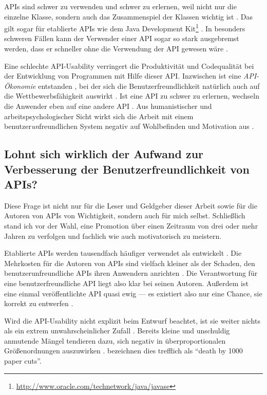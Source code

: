 APIs sind schwer zu verwenden \citep{Stylos:2006ji} und schwer zu erlernen, weil nicht nur die einzelne Klasse, sondern auch das Zusammenspiel der Klassen wichtig ist \citep{Bruch:2006bv}. Das gilt sogar für etablierte APIs wie dem Java Development Kit\footnote{\url{http://www.oracle.com/technetwork/java/javase}} \citep{Stylos:2009gc}. In besonders schweren Fällen kann der Verwender einer API sogar so stark ausgebremst werden, dass er schneller ohne die Verwendung der API gewesen wäre \citep{Stylos:2007ip}.

Eine schlechte API-Usability verringert die Produktivität und Codequalität \citep{Zibran:2011fx} bei der Entwicklung von Programmen mit Hilfe dieser API. Inzwischen ist eine \textit{API-Ökonomie} entstanden \citep{Hulsenbusch:2014wr}, bei der sich die Benutzerfreundlichkeit natürlich auch auf die Wettbewerbsfähigkeit auswirkt \citep{Stylos:2009ts}. Ist eine API zu schwer zu erlernen, wechseln die Anwender eben auf eine andere API \citep{sunshine2014searching}. Aus humanistischer und arbeitspsychologischer Sicht wirkt sich die Arbeit mit einem benutzer\textit{un}freundlichen System negativ auf Wohlbefinden und Motivation aus \citep{Sarodnick:2006vc}.

\subsection[Nutzen von API-Usability]{Lohnt sich wirklich der Aufwand zur Verbesserung der Benutzerfreundlichkeit von APIs?}

Diese Frage ist nicht nur für die Leser und Geldgeber dieser Arbeit sowie für die Autoren von APIs von Wichtigkeit, sondern auch für mich selbst. Schließlich stand ich vor der Wahl, eine Promotion über einen Zeitraum von drei oder mehr Jahren zu verfolgen und fachlich wie auch motivatorisch zu meistern.

Etablierte APIs werden tausendfach häufiger verwendet als entwickelt \citep{Ellis:2007kv}. Die Mehrkosten für die Autoren von APIs sind vielfach kleiner als der Schaden, den benutzerunfreundliche APIs ihren Anwendern anrichten \citep{Henning:2007kg}. Die Verantwortung für eine benutzerfreundliche API liegt also klar bei seinen Autoren. Außerdem ist eine einmal veröffentlichte API quasi ewig --- es existiert also nur eine Chance, sie korrekt zu entwerfen \citep{Bloch:2006jk}.

Wird die API-Usability nicht explizit beim Entwurf beachtet, ist sie weiter nichts als ein extrem unwahrscheinlicher Zufall \citep{Stylos:2009ts}. Bereits kleine und unschuldig anmutende Mängel tendieren dazu, sich negativ in überproportionalen Größenordnungen auszuwirken \citep{Henning:2009hz}. \cite{Stylos:2007ip} bezeichnen dies trefflich als ``death by 1000 paper cuts''.

